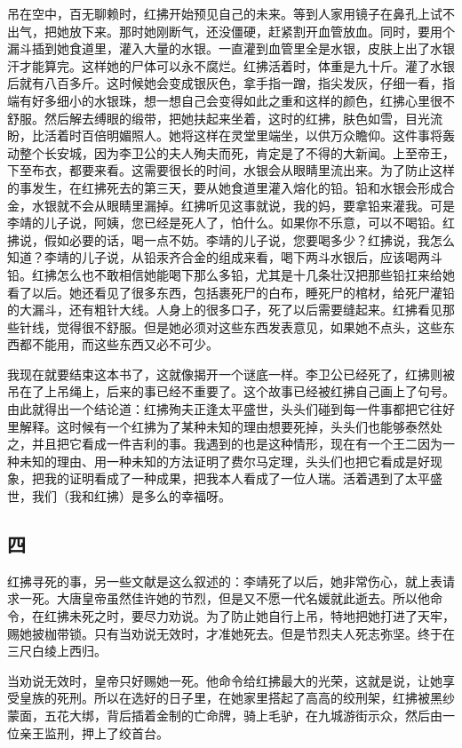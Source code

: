 吊在空中，百无聊赖时，红拂开始预见自己的未来。等到人家用镜子在鼻孔上试不出气，把她放下来。那时她刚断气，还没僵硬，赶紧割开血管放血。同时，要用个漏斗插到她食道里，灌入大量的水银。一直灌到血管里全是水银，皮肤上出了水银汗才能算完。这样她的尸体可以永不腐烂。红拂活着时，体重是九十斤。灌了水银后就有八百多斤。这时候她会变成银灰色，拿手指一蹭，指尖发灰，仔细一看，指端有好多细小的水银珠，想一想自己会变得如此之重和这样的颜色，红拂心里很不舒服。然后解去缚眼的缎带，把她扶起来坐着，这时的红拂，肤色如雪，目光流盼，比活着时百倍明媚照人。她将这样在灵堂里端坐，以供万众瞻仰。这件事将轰动整个长安城，因为李卫公的夫人殉夫而死，肯定是了不得的大新闻。上至帝王，下至布衣，都要来看。这需要很长的时间，水银会从眼睛里流出来。为了防止这样的事发生，在红拂死去的第三天，要从她食道里灌入熔化的铅。铅和水银会形成合金，水银就不会从眼睛里漏掉。红拂听见这事就说，我的妈，要拿铅来灌我。可是李靖的儿子说，阿姨，您已经是死人了，怕什么。如果你不乐意，可以不喝铅。红拂说，假如必要的话，喝一点不妨。李靖的儿子说，您要喝多少？红拂说，我怎么知道？李靖的儿子说，从铅汞齐合金的组成来看，喝下两斗水银后，应该喝两斗铅。红拂怎么也不敢相信她能喝下那么多铅，尤其是十几条壮汉把那些铅扛来给她看了以后。她还看见了很多东西，包括裹死尸的白布，睡死尸的棺材，给死尸灌铅的大漏斗，还有粗针大线。人身上的很多口子，死了以后需要缝起来。红拂看见那些针线，觉得很不舒服。但是她必须对这些东西发表意见，如果她不点头，这些东西都不能用，而这些东西又必不可少。 

我现在就要结束这本书了，这就像揭开一个谜底一样。李卫公已经死了，红拂则被吊在了上吊绳上，后来的事已经不重要了。这个故事已经被红拂自己画上了句号。由此就得出一个结论道：红拂殉夫正逢太平盛世，头头们碰到每一件事都把它往好里解释。这时候有一个红拂为了某种未知的理由想要死掉，头头们也能够泰然处之，并且把它看成一件吉利的事。我遇到的也是这种情形，现在有一个王二因为一种未知的理由、用一种未知的方法证明了费尔马定理，头头们也把它看成是好现象，把我的证明看成了一种成果，把我本人看成了一位人瑞。活着遇到了太平盛世，我们（我和红拂）是多么的幸福呀。 

\subsection{四} 

红拂寻死的事，另一些文献是这么叙述的：李靖死了以后，她非常伤心，就上表请求一死。大唐皇帝虽然佳许她的节烈，但是又不愿一代名媛就此逝去。所以他命令，在红拂未死之时，要尽力劝说。为了防止她自行上吊，特地把她打进了天牢，赐她披枷带锁。只有当劝说无效时，才准她死去。但是节烈夫人死志弥坚。终于在三尺白绫上西归。 

当劝说无效时，皇帝只好赐她一死。他命令给红拂最大的光荣，这就是说，让她享受皇族的死刑。所以在选好的日子里，在她家里搭起了高高的绞刑架，红拂被黑纱蒙面，五花大绑，背后插着金制的亡命牌，骑上毛驴，在九城游街示众，然后由一位亲王监刑，押上了绞首台。 

